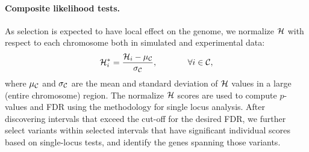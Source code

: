\paragraph{Composite likelihood tests.}
As selection is expected to have local effect on the genome, we
normalize ${\cal H}$ with respect to each chromosome both in simulated and
experimental data:
\begin{equation} {\cal H}_i^*=\frac{{\cal H}_i-\mu_{\cal C}}{\sigma_{\cal C}},
\hspace{0.5in} \forall i \in {\cal C},
\end{equation} 
where $\mu_{\cal C}$ and $\sigma_{\cal C}$ are the mean and standard deviation
of ${\cal H}$ values in a large (entire chromosome) region. The normalize
${\cal H}$ scores are used to compute $p$-values and FDR using the
methodology for single locus analysis. After discovering intervals
that exceed the cut-off for the desired FDR, we further select
variants within selected intervals that have significant individual
scores based on single-locus tests, and identify the genes spanning
those variants.

